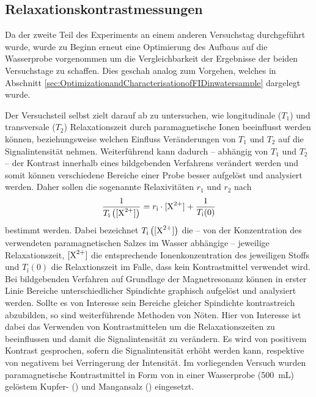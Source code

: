 \subsection{Relaxationskontrastmessungen}
\label{sec:Signalintensitaet}
Da der zweite Teil des Experiments an einem anderen Versuchstag durchgeführt wurde, wurde zu Beginn erneut eine Optimierung des Aufbaus auf die Wasserprobe vorgenommen um die Vergleichbarkeit der Ergebnisse der beiden Versuchstage zu schaffen. Dies geschah analog zum Vorgehen, welches in Abschnitt \ref{sec:OptimizationandCharacterisationofFIDinwatersample} dargelegt wurde.

Der Versuchsteil selbst zielt darauf ab zu untersuchen, wie longitudinale ($T_1$) und transversale ($T_2$) Relaxationszeit durch paramagnetische Ionen beeinflusst werden können, beziehungsweise welchen Einfluss Veränderungen von $T_1$ und $T_2$ auf die Signalintensität nehmen.
Weiterführend kann dadurch -- abhängig von $T_1$ und $T_2$ -- der Kontrast innerhalb eines bildgebenden Verfahrens verändert werden und somit können verschiedene Bereiche einer Probe besser aufgelöst und analysiert werden. 
Daher sollen die sogenannte Relaxivitäten $r_1$ und $r_2$ nach
\begin{align}
    \frac{1}{T_{\text{i}}\left([\ce{X^2+}]\right)} = r_{\text{i}} \cdot [\ce{X^2+}] + \frac{1}{T_{\text{i}}(0)} \label{eq:relaxivitat}
\end{align}
bestimmt werden. Dabei bezeichnet $T_{\text{i}}\left([\ce{X^2+}]\right)$ die -- von der Konzentration des verwendeten paramagnetischen Salzes im Wasser abhängige -- jeweilige Relaxationszeit, $[\ce{X^2+}]$  die entsprechende Ionenkonzentration des jeweiligen Stoffs und $T_{\text{i}}(0)$ die Relaxtionszeit im Falle, dass kein Kontrastmittel verwendet wird.\newline
Bei bildgebenden Verfahren auf Grundlage der Magnetresonanz können in erster Linie Bereiche unterschiedlicher Spindichte graphisch aufgelöst und analysiert werden.
Sollte es von Interesse sein Bereiche gleicher Spindichte kontrastreich abzubilden, so sind weiterführende Methoden von Nöten.
Hier von Interesse ist dabei das Verwenden von Kontrastmittelen um die Relaxationszeiten zu beeinflussen und damit die Signalintensität zu verändern.
Es wird von positivem Kontrast gesprochen, sofern die Signalintensität erhöht werden kann, respektive von negativem bei Verringerung der Intensität.
Im vorliegenden Versuch wurden paramagnetische Kontrastmittel in Form von in einer Wasserprobe (\SI{500}{\milli \liter}) gelöstem Kupfer- () und Mangansalz () eingesetzt.
